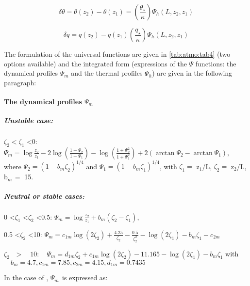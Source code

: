 \begin{equation}
\label{eq:atmo:eq10}
\delta \theta=\theta (z_2) -\theta (z_1)=
\left(\frac{\theta_{\star}}{\kappa} \right)\Psi_{h}\left({L,z_2,z_1} \right)
\end{equation}

\begin{equation}
\label{eq:atmo:eq11}
\delta q=q(z_2)-q(z_1)
\left( {\frac{q_{\star}}{\kappa}} \right)\Psi_{h} \left({L,z_2,z_1} \right)
\end{equation}

The formulation of the universal functions are given in \tablename{} \ref{tab:atmo:tab4} (two
options available) and the integrated form (expressions of the $\Psi$ functions:
the dynamical profiles $\Psi_{m}$ and the thermal profiles $\Psi_{h}$) are given in the following paragraph:

\paragraph{The dynamical profiles $\Psi_{m}$}

\subparagraph{Unstable case:}

$\zeta_{2}< \zeta_{1}$ \textless 0:
$\Psi_{m} =\log \frac{z_{2}}{z_{1}}-2\log \left({\frac{1+\Psi_{2} }{1+\Psi_{1} }}\right)-\log
\left( {\frac{1+\Psi_{2}^{2} }{1+\Psi_{1}^{2} }} \right)+2\left( {\arctan
\Psi_{2} -\arctan \Psi_{1} } \right)$,
\newline
where $\Psi_{2}= (1-b_{m} \zeta_{2})^{1/4}$ and $\Psi_{1} =(1-b_{m} \zeta_{1})^{1/4}$,
\newline
with $\zeta_{1}= $ z$_{1}$/L, $\zeta_{2}= $ z$_{2}$/L, b$_{m\, }= $ 15.

\subparagraph{Neutral or stable cases:}

0 \textless $\zeta_{1}$ \textless $\zeta_{2}$ \textless 0.5:
$\Psi_{m} =\log\frac{z_{2} }{z_{1} }+b_{m} \left( {\zeta_{2} -\zeta_{1} } \right)$,

0.5 \textless $\zeta_{2}$ \textless 10:
$\Psi_{m} =c_{1m} \log(2\zeta_{2})+\frac{4.25}{\zeta_{2}}-\frac{0.5}{\zeta_{2}^{2}}-\log(2\zeta_{1} )-b_{m} \zeta_{1} -c_{2m} $

$\zeta_{2\quad }>\quad 10:
\quad
\Psi_{m} =d_{1m} \zeta_{2}
+c_{1m} \log\left( {2\zeta_{2} }
\right)-\mbox{11.165}-\log(2\zeta_{1}
)-b_{m} \zeta_{1}
$
\newline
with $\quad b_{m} = 4.7, c_{1m} = 7.85, c_{2m} = 4.15, d_{1m} = 0.7435$

In the case of \cite{Cheng:2005}, $\Psi_{m\, }$ is expressed as:

